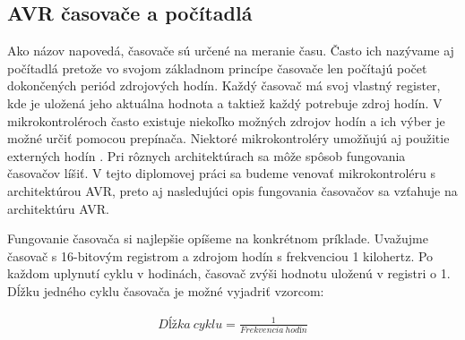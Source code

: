 \setcounter{tocdepth}{4}
\setcounter{secnumdepth}{4}

\subsection{AVR časovače a počítadlá}
\noindent

Ako názov napovedá, časovače sú určené na meranie času. Často ich nazývame aj počítadlá
pretože vo svojom základnom princípe časovače len počítajú počet dokončených periód zdrojových hodín.
Každý časovač má svoj vlastný register, kde je uložená jeho aktuálna hodnota a taktiež každý potrebuje zdroj hodín. V mikrokontroléroch často existuje niekoľko možných zdrojov
hodín a ich výber je možné určiť pomocou prepínača. Niektoré mikrokontroléry umožňujú aj použitie
externých hodín \cite{IntroductionMicrocontrollerTimers}. Pri rôznych architektúrach sa môže spôsob fungovania časovačov líšiť. V tejto diplomovej práci sa budeme venovať
mikrokontroléru s architektúrou AVR, preto aj nasledujúci opis fungovania časovačov sa vzťahuje na architektúru AVR.\par
Fungovanie časovača si najlepšie opíšeme na konkrétnom príklade.
Uvažujme časovač s 16-bitovým registrom a zdrojom hodín s frekvenciou 1 kilohertz. Po každom uplynutí cyklu v hodinách, časovač
zvýši hodnotu uloženú v registri o 1. Dĺžku jedného cyklu časovača je možné vyjadriť vzorcom:

\begin{equation}
    \begin{aligned}
        Dĺžka\:cyklu = \frac{1}{Frekvencia\:hodín}
    \end{aligned}
\end{equation}

